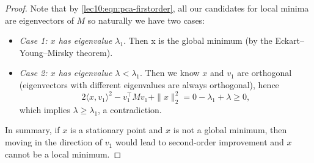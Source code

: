 \begin{proof}
Note that by \eqref{lec10:eqn:pca-firstorder}, all our candidates for local minima are eigenvectors of $M$ so naturally we have two cases:
\begin{itemize}
\item \textit{Case 1: $x$ has eigenvalue $\lambda_1$}. Then x is the global minimum (by the Eckart–Young–Mirsky theorem).
\item \textit{Case 2: $x$ has eigenvalue $\lambda < \lambda_1$}. Then we know $x$ and $v_1$ are orthogonal (eigenvectors with different eigenvalues are always orthogonal), hence 
\begin{equation}
2\langle x, v_1 \rangle^2 - v_1^\top Mv_1 + \|x\|_2^2 = 0  -\lambda_1 + \lambda \geq 0,
\end{equation}
which implies $\lambda \geq \lambda_1$, a contradiction. 
\end{itemize}

In summary, if $x$ is a stationary point and $x$ is not a global minimum, then moving in the direction of $v_1$ would lead to second-order improvement and $x$ cannot be a local minimum. 
\end{proof}

